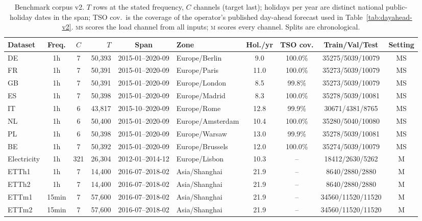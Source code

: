 \begin{table}[!t]
\centering
\caption{Benchmark corpus v2. $T$ rows at the stated frequency, $C$ channels (target last); holidays per year are distinct national public-holiday dates in the span; TSO cov.\ is the coverage of the operator's published day-ahead forecast used in Table~\ref{tab:dayahead-v2}. \textsc{ms} scores the load channel from all inputs; \textsc{m} scores every channel. Splits are chronological.}
\label{tab:datasets-v2}
\setlength{\tabcolsep}{3.5pt}\footnotesize
\begin{adjustbox}{max width=\linewidth}
\begin{tabular}{lccrclcccc}
\toprule
Dataset & Freq. & $C$ & $T$ & Span & Zone & Hol./yr & TSO cov. & Train/Val/Test & Setting \\
\midrule
DE & 1h & 7 & 50{,}393 & 2015-01--2020-09 & Europe/Berlin & 9.0 & 100.0\% & 35275/5039/10079 & MS \\
FR & 1h & 7 & 50{,}391 & 2015-01--2020-09 & Europe/Paris & 11.0 & 100.0\% & 35273/5039/10079 & MS \\
GB & 1h & 7 & 50{,}391 & 2015-01--2020-09 & Europe/London & 8.5 & 99.8\% & 35273/5039/10079 & MS \\
ES & 1h & 7 & 50{,}398 & 2015-01--2020-09 & Europe/Madrid & 8.3 & 100.0\% & 35278/5039/10081 & MS \\
IT & 1h & 6 & 43{,}817 & 2015-10--2020-09 & Europe/Rome & 12.8 & 99.9\% & 30671/4381/8765 & MS \\
NL & 1h & 6 & 50{,}400 & 2015-01--2020-09 & Europe/Amsterdam & 10.4 & 100.0\% & 35280/5040/10080 & MS \\
PL & 1h & 6 & 50{,}398 & 2015-01--2020-09 & Europe/Warsaw & 13.0 & 99.9\% & 35278/5039/10081 & MS \\
BE & 1h & 7 & 50{,}392 & 2015-01--2020-09 & Europe/Brussels & 12.0 & 100.0\% & 35274/5039/10079 & MS \\
Electricity & 1h & 321 & 26{,}304 & 2012-01--2014-12 & Europe/Lisbon & 10.3 & -- & 18412/2630/5262 & M \\
ETTh1 & 1h & 7 & 14{,}400 & 2016-07--2018-02 & Asia/Shanghai & 21.9 & -- & 8640/2880/2880 & M \\
ETTh2 & 1h & 7 & 14{,}400 & 2016-07--2018-02 & Asia/Shanghai & 21.9 & -- & 8640/2880/2880 & M \\
ETTm1 & 15min & 7 & 57{,}600 & 2016-07--2018-02 & Asia/Shanghai & 21.9 & -- & 34560/11520/11520 & M \\
ETTm2 & 15min & 7 & 57{,}600 & 2016-07--2018-02 & Asia/Shanghai & 21.9 & -- & 34560/11520/11520 & M \\
\bottomrule
\end{tabular}
\end{adjustbox}
\end{table}
